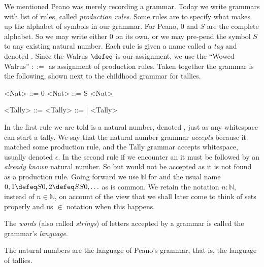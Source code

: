 \index{\code{::=}}
We mentioned Peano was merely recording a grammar.  Today we write grammars with
list of rules, called \emph{production rules}.  Some rules are to specify what
makes up the alphabet of symbols in our grammar.  For Peano, $0$ and $S$ are the
complete alphabet.  So we may write either $0$ on its own, or we may pre-pend
the symbol $S$ to any existing natural number.  Each rule is given a name called
a \emph{tag} and denoted . Since the Walrus
$\defeq$ is our assignment, we use the
``Wowed Walrus'' $::=$ as assignment of production rules.   Taken together
the grammar is the following, shown next to the childhood grammar for tallies.
\begin{center}
\begin{minipage}{0.4\textwidth}
\begin{Gcode}[]
<Nat> ::= 0 
<Nat> ::= S <Nat>
\end{Gcode}
\end{minipage}
\hfill
\begin{minipage}{0.45\textwidth}
\begin{Gcode}[]
<Tally> ::=  
<Tally> ::= | <Tally>
\end{Gcode}
\end{minipage}
\end{center}
In the first rule we are told  is a natural number, denoted
, just as any whitespace can start a tally. We say that the natural
number grammar \emph{accepts}  because it matched some production rule,
and the Tally grammar accepts whitespace, usually denoted $\epsilon$.  In the
second rule if we encounter an  it must be followed by an \emph{already
known} natural number.  So  but  would not be accepted as
it is not found as a production rule.  Going forward we use $\mathbb{N}$ 
for  and the usual name $0,1\defeq S0, 2\defeq SS0,\ldots$ as is common.
We retain the notation $n:\mathbb{N}$, instead of $n\in \mathbb{N}$, on account 
of the view that we shall later come to think of sets properly and us $\in$ notation 
when this happens.

\begin{definition}
    The \emph{words} (also called \emph{strings}) of letters accepted by a grammar is called
    the grammar's \emph{language}.
\end{definition}

\begin{example}
The natural numbers are the language of Peano's grammar, that is, the language of tallies.
\end{example}


